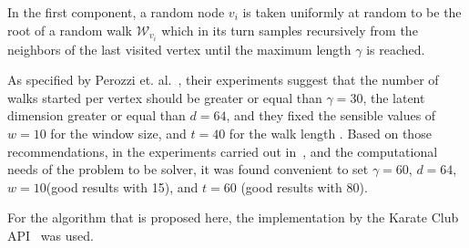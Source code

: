 In the first component, a random node $v_i$ is taken uniformly at random to be the root of a random walk $\mathcal W_{v_i}$ which in its turn samples recursively from the neighbors of the last visited vertex until the maximum length $\gamma$ is reached.

As specified by Perozzi et. al.~\citep{deepwalk}, their experiments suggest that the number of walks started per vertex should be greater or equal than $\gamma=30$, the latent dimension greater or equal than $d=64$, and they fixed the sensible values of $w=10$ for the window size, and $t=40$ for the walk length . Based on those recommendations, in the experiments carried out in~\citep{deepwalk_hyper}, and the computational needs of the problem to be solver, it was found convenient to set $\gamma=60$, $d=64$, $w=10$(good results with 15), and $t=60$ (good results with 80).


For the algorithm that is proposed here, the implementation by the Karate Club API~\cite{karateclub} was used.
